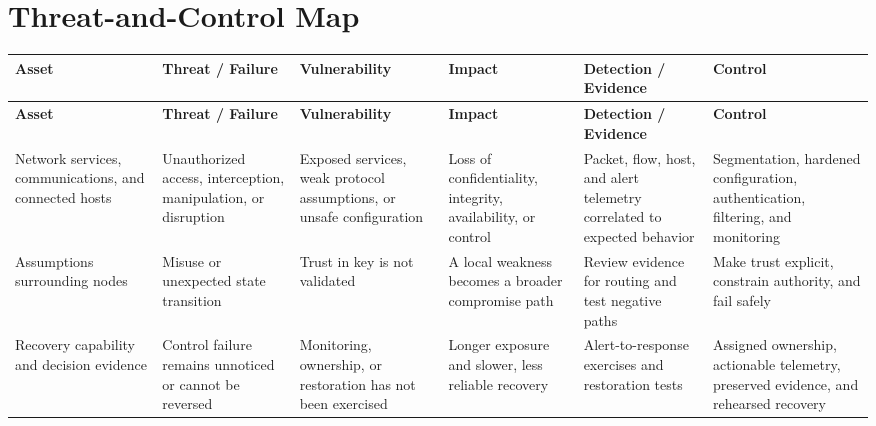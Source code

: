 \documentclass[11pt]{article}
\begin{document}
\section*{Threat-and-Control Map}
\begingroup\scriptsize\setlength{\tabcolsep}{2pt}
\begin{longtable}{>{\RaggedRight\arraybackslash}p{}>{\RaggedRight\arraybackslash}p{}>{\RaggedRight\arraybackslash}p{}>{\RaggedRight\arraybackslash}p{}>{\RaggedRight\arraybackslash}p{}>{\RaggedRight\arraybackslash}p{}}
\toprule\rowcolor{Navy}\color{white}\textbf{Asset} & \color{white}\textbf{Threat / Failure} & \color{white}\textbf{Vulnerability} & \color{white}\textbf{Impact} & \color{white}\textbf{Detection / Evidence} & \color{white}\textbf{Control}\\\midrule
\endfirsthead
\toprule\rowcolor{Navy}\color{white}\textbf{Asset} & \color{white}\textbf{Threat / Failure} & \color{white}\textbf{Vulnerability} & \color{white}\textbf{Impact} & \color{white}\textbf{Detection / Evidence} & \color{white}\textbf{Control}\\\midrule
\endhead
Network services, communications, and connected hosts & Unauthorized access, interception, manipulation, or disruption & Exposed services, weak protocol assumptions, or unsafe configuration & Loss of confidentiality, integrity, availability, or control & Packet, flow, host, and alert telemetry correlated to expected behavior & Segmentation, hardened configuration, authentication, filtering, and monitoring\\\midrule
Assumptions surrounding nodes & Misuse or unexpected state transition & Trust in key is not validated & A local weakness becomes a broader compromise path & Review evidence for routing and test negative paths & Make trust explicit, constrain authority, and fail safely\\\midrule
Recovery capability and decision evidence & Control failure remains unnoticed or cannot be reversed & Monitoring, ownership, or restoration has not been exercised & Longer exposure and slower, less reliable recovery & Alert-to-response exercises and restoration tests & Assigned ownership, actionable telemetry, preserved evidence, and rehearsed recovery\\\midrule
\bottomrule
\end{longtable}
\endgroup
\end{document}

